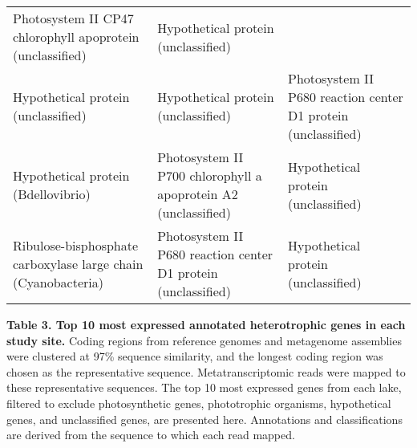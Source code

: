 \documentclass[]{article}
\begin{document}
\begin{longtable}[]{@{}lll@{}}
\begin{minipage}[t]{0.33\columnwidth}
Photosystem II CP47 chlorophyll apoprotein (unclassified)\strut
\end{minipage} & \begin{minipage}[t]{0.33\columnwidth}\raggedright\strut
Hypothetical protein (unclassified)\strut
\end{minipage}\tabularnewline
\begin{minipage}[t]{0.24\columnwidth}\raggedright\strut
Hypothetical protein (unclassified)\strut
\end{minipage} & \begin{minipage}[t]{0.33\columnwidth}\raggedright\strut
Hypothetical protein (unclassified)\strut
\end{minipage} & \begin{minipage}[t]{0.33\columnwidth}\raggedright\strut
Photosystem II P680 reaction center D1 protein (unclassified)\strut
\end{minipage}\tabularnewline
\begin{minipage}[t]{0.24\columnwidth}\raggedright\strut
Hypothetical protein (Bdellovibrio)\strut
\end{minipage} & \begin{minipage}[t]{0.33\columnwidth}\raggedright\strut
Photosystem II P700 chlorophyll a apoprotein A2 (unclassified)\strut
\end{minipage} & \begin{minipage}[t]{0.33\columnwidth}\raggedright\strut
Hypothetical protein (unclassified)\strut
\end{minipage}\tabularnewline
\begin{minipage}[t]{0.24\columnwidth}\raggedright\strut
Ribulose-bisphosphate carboxylase large chain (Cyanobacteria)\strut
\end{minipage} & \begin{minipage}[t]{0.33\columnwidth}\raggedright\strut
Photosystem II P680 reaction center D1 protein (unclassified)\strut
\end{minipage} & \begin{minipage}[t]{0.33\columnwidth}\raggedright\strut
Hypothetical protein (unclassified)\strut
\end{minipage}\tabularnewline
\bottomrule
\end{longtable}

\textbf{Table 3. Top 10 most expressed annotated heterotrophic genes in
each study site.} Coding regions from reference genomes and metagenome
assemblies were clustered at 97\% sequence similarity, and the longest
coding region was chosen as the representative sequence.
Metatranscriptomic reads were mapped to these representative sequences.
The top 10 most expressed genes from each lake, filtered to exclude
photosynthetic genes, phototrophic organisms, hypothetical genes, and
unclassified genes, are presented here. Annotations and classifications
are derived from the sequence to which each read mapped.
\end{document}
